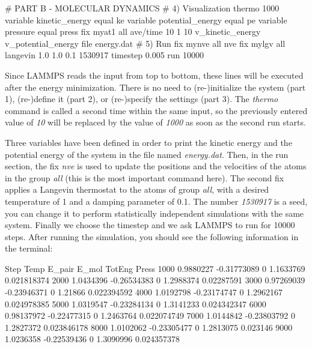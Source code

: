 \begin{lcverbatim}
# PART B - MOLECULAR DYNAMICS
# 4) Visualization
thermo 1000
variable kinetic_energy equal ke
variable potential_energy equal pe
variable pressure equal press
fix myat1 all ave/time 10 1 10 v_kinetic_energy v_potential_energy file energy.dat
# 5) Run
fix mynve all nve
fix mylgv all langevin 1.0 1.0 0.1 1530917
timestep 0.005
run 10000
\end{lcverbatim}

\noindent Since LAMMPS reads the input from top to
bottom, these lines will be executed after the energy
minimization. There is no need to (re-)initialize the system
(part 1), (re-)define it (part 2), or (re-)specify the settings
(part 3). The \textit{thermo} command is called a second time within the 
same input, so the previously entered value of \textit{10} will be replaced
by the value of \textit{1000} as soon as the second run starts.

Three variables have been defined in order
to print the kinetic energy and the potential energy 
of the system in the file named \textit{energy.dat}. Then,
in the run section, the fix \textit{nve} is used to update the
positions and the velocities of the atoms in the group
\textit{all} (this is the most important command here). The second
fix applies a Langevin thermostat to the atoms of group
\textit{all}, with a desired temperature of 1 and a damping
parameter of 0.1. The number \textit{1530917} is a seed, you can
change it to perform statistically independent simulations
with the same system. Finally we choose the timestep
and we ask LAMMPS to run for 10000 steps. After running
the simulation, you should see the following information in
the terminal:

\begin{lcverbatim}
Step         Temp       E_pair    E_mol       TotEng        Press
1000    0.9880227  -0.31773089        0    1.1633769  0.021818374 
2000    1.0434396  -0.26534383        0    1.2988374   0.02287591 
3000   0.97269039  -0.23946371        0      1.21866  0.022394592 
4000    1.0192798  -0.23174747        0    1.2962167  0.024978385 
5000    1.0319547  -0.23284134        0    1.3141233  0.024342347 
6000   0.98137972  -0.22477315        0    1.2463764  0.022074749 
7000    1.0144842  -0.23803792        0    1.2827372  0.023846178 
8000    1.0102062  -0.23305477        0    1.2813075     0.023146 
9000    1.0236358  -0.22539436        0    1.3090996  0.024357378 
\end{lcverbatim}

